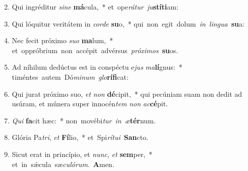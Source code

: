 \begin{flushleft}
\begin{enumerate}[leftmargin=*]
\setcounter{enumi}{1}

\item Qui ingréditur {\it si}{\it ne} \textbf{má}cula,~* \mbox{et ope{\it rá}{\it tur} {\it ju}\textbf{stí}\textbf{ti}am:}
\item Qui lóquitur veritátem in {\it cor}{\it de} \textbf{su}o,~* \mbox{qui non egit dolum {\it in} {\it lin}{\it gua} \textbf{su}a:}
\item Nec fecit próximo {\it su}{\it o} \textbf{ma}lum,~* \mbox{et oppróbrium non accépit advérsus {\it pró}{\it xi}{\it mos} \textbf{su}os.}
\item Ad níhilum dedúctus est in conspéctu e{\it jus} {\it ma}\textbf{lí}gnus:~* \mbox{timéntes autem Dó{\it mi}{\it num} {\it glo}\textbf{rí}\textbf{fi}cat:}
\item Qui jurat próximo suo, {\it et} {\it non} \textbf{dé}cipit,~* qui pecúniam suam non dedit ad usúram, et múnera super innocén{\it tem} {\it non} {\it ac}\textbf{cé}pit.
\item {\it Qui} \textbf{fa}cit hæc:~* \mbox{non movébi{\it tur} {\it in} {\it æ}\textbf{tér}num.}
\item Glória Pa{\it tri}, {\it et} \textbf{Fí}lio,~* \mbox{et Spi{\it rí}{\it tu}{\it i} \textbf{San}cto.}
\item Sicut erat in princípio, et {\it nunc}, {\it et} \textbf{sem}per,~* \mbox{et in s\'{\ae}cula sæ{\it cu}{\it ló}{\it rum}. \textbf{A}men.}

\end{enumerate}
\end{flushleft}

